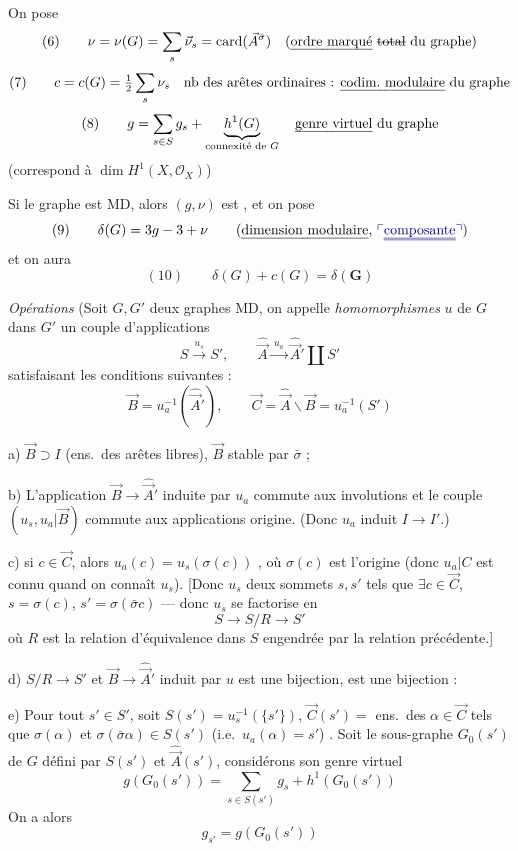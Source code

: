 \documentclass[11pt,a4paper]{article}
\begin{document}
On pose
\[
(6)\qquad \nu=\nu(G) = \sum_s \vec{\nu}_s = \operatorname{card}(\vec{A}^{\bar\sigma})
\quad(\text{\emph{ordre marqué} \struck{total} du graphe})
\]
\[
(7)\qquad c=c(G)=\tfrac12\sum_s\nu_s
\quad\text{nb des arêtes ordinaires : \emph{codim.\ modulaire} du graphe}
\]
\[
(8)\qquad g=\sum_{s\in S}g_s+\underbrace{h^1(G)}_{\text{connexité de }G}
\quad\text{\emph{genre virtuel} du graphe}
\]
(correspond à $\dim H^1(X,\mathcal{O}_X)$)

Si le graphe est MD, alors $(g,\nu)$ est , et on pose
\[
(9)\qquad \delta(G)=3g-3+\nu
\qquad(\text{\emph{dimension modulaire}, \add{\emph{\uncertain{composante}}}})
\]
et on aura
\[
(10)\qquad \delta(G)+c(G)=\delta(\mathbf{G})
\]

\emph{Opérations} (Soit $G,G'$ deux graphes MD, on appelle \emph{homomorphismes}  \emph{} $u$ de $G$ dans $G'$ un couple d'applications
\[
S\xrightarrow{\ u_s\ }S',
\qquad
\hat{\vec{A}}\xrightarrow{\ u_a\ }\hat{\vec{A}}{}'\amalg S'
\]
satisfaisant les conditions suivantes :
\[
\vec{B}=u_a^{-1}(\hat{\vec{A}}{}'),\qquad
\vec{C}=\hat{\vec{A}}\smallsetminus\vec{B}=u_a^{-1}(S')
\]

a) $\vec{B}\supset I$ (ens.\ des arêtes libres), $\vec{B}$ stable par $\bar\sigma$ ;

b) L'application $\vec{B}\to\hat{\vec{A}}{}'$ induite par $u_a$ commute aux involutions et le couple $(u_s,u_a|\vec{B})$ commute aux applications origine. (Donc $u_a$ induit $I\to I'$.)

c) \struck{\ill{}} si $c\in\vec{C}$, alors $u_a(c)=u_s(\sigma(c))$ , où $\sigma(c)$ est l'origine (donc $u_a|C$ est connu quand on connaît $u_s$). [Donc $u_s$    \ill{} deux  sommets $s,s'$ tels que $\exists c\in\vec{C}$, $s=\sigma(c)$, $s'=\sigma(\bar\sigma c)$ --- donc $u_s$ se factorise en
\[
S\to S/R\to S'
\]
où $R$ est la relation d'équivalence dans $S$ engendrée par la relation précédente.]

d) $S/R\to S'$ et $\vec{B}\to\hat{\vec{A}}{}'$ induit par $u$ est une bijection, est une bijection :

e) Pour tout $s'\in S'$, soit $S(s')=u_s^{-1}(\{s'\})$, $\vec{C}(s')=$ ens.\ des $\alpha\in\vec{C}$ tels que $\sigma(\alpha)$ et $\sigma(\bar\sigma\alpha)\in S(s')$ (i.e.\ $u_a(\alpha)=s'$) . Soit le sous-graphe  $G_0(s')$ \struck{\ill{}} de $G$ défini par $S(s')$ et $\hat{\vec{A}}(s')$, considérons son genre virtuel
\[
g(G_0(s'))=\sum_{s\in S(s')}g_s+h^1(G_0(s'))
\]
On a alors
\[
g_{s'}=g(G_0(s'))
\]
\end{document}
